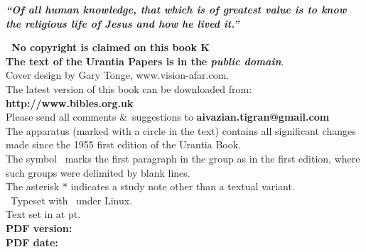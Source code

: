 
\newpage
\makeatletter
{}%
\makeatother

\newcommand{\serpimolot}{{\fontspec{Mortbats} K}}

\begin{center}
\begin{center}\parbox{7cm}{\bfseries\itshape ``Of all human knowledge, that which is of greatest value is to know the religious life of Jesus and how he lived it.'' }\end{center}
\parbox{0.9\linewidth}{\centering
\textbf{\upshape\nocopyright\ No copyright is claimed on this book \serpimolot\\
The text of the Urantia Papers is in the \itshape public domain}.\\[5pt]
Cover design by Gary Tonge, www.vision-afar.com.\\
The latest version of this book can be downloaded from:\\
{\upshape\bfseries http://www.bibles.org.uk}\\
Please send all comments \&\ suggestions to {\makeatletter\upshape\bfseries aivazian.tigran@gmail.com\makeatother}\\
The apparatus (marked with a circle in the text) contains all significant changes made since the 1955 first edition of the Urantia Book.\\
The symbol \pc\ marks the first paragraph in the group as in the first edition, where such groups were delimited by blank lines.\\
The asterisk * indicates a study note other than a textual variant.\\[5pt]
\tux\ Typeset with \XeLaTeX\ under Linux.\\
Text set in \textbf{\urantiamainfont} at \urantiamainfontsize pt.\\[18pt]
\upshape\small\bfseries PDF version: \\
\upshape\small\bfseries PDF date: \mytoday{}\\
}
\end{center}

